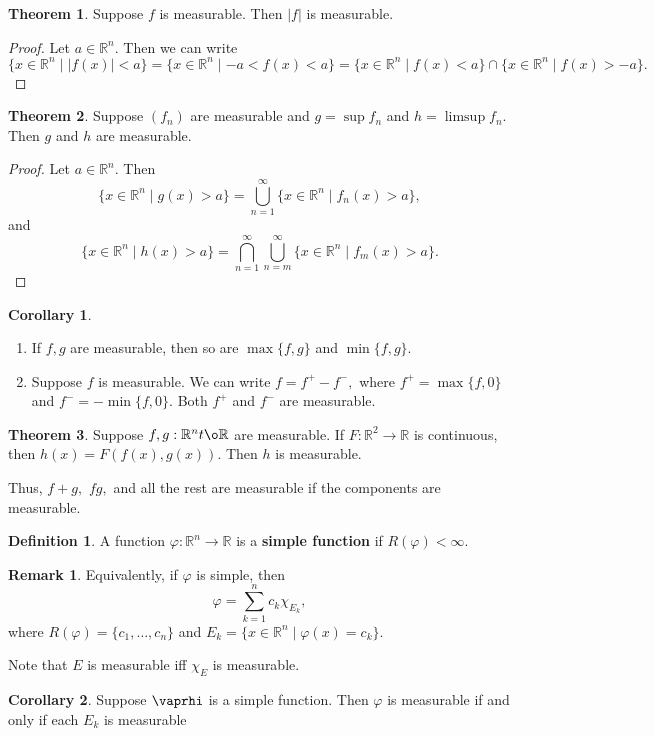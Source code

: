 \documentclass[10pt, oneside]{article}
\newcommand{\bbR}{\mathbb{R}}
\theoremstyle{definition}
\newtheorem{thm}{Theorem}
\newtheorem{defn}{Definition}
\newtheorem{rem}{Remark}
\newtheorem{cor}{Corollary}
\begin{document}
\begin{thm}
    Suppose $f$ is measurable. Then $|f|$ is measurable.
\end{thm}
\begin{proof}
    Let $a\in \bbR^n.$ Then we can write
    \[\{x \in \bbR^n \mid |f(x)| < a\} = \{x \in \bbR^n \mid -a<f(x) < a\} = \{x \in \bbR^n \mid f(x) < a\} \cap \{x \in \bbR^n \mid f(x) >- a\}.\]
\end{proof}
\begin{thm}
    Suppose $(f_n)$ are measurable and $g = \sup f_n$ and $h = \limsup f_n.$ Then $g$ and $h$ are measurable.
\end{thm}
\begin{proof}
    Let $a\in \bbR^n.$ Then 
    \[\{x \in \bbR^n \mid g(x) > a\} = \bigcup_{n=1}^\infty \{x \in \bbR^n \mid f_n(x) >a\},\] and 
    \[\{x \in \bbR^n \mid h(x) > a\} = \bigcap_{n=1}^\infty\bigcup_{n=m}^\infty \{x \in \bbR^n \mid f_m(x) >a\}.\]
\end{proof}

\begin{cor}
\begin{enumerate}
    \item If $f,g$ are measurable, then so are $\max\{f,g\}$ and $\min\{f,g\}.$
    \item Suppose $f$ is measurable. We can write $f = f^+ - f^-,$ where $f^+ = \max\{f,0\}$ and $f^- = -\min\{f,0\}.$ Both $f^+$ and $f^-$ are measurable.
\end{enumerate}
\end{cor}

\begin{thm}
    Suppose $f,g: \bbR^n t\o \bbR$ are measurable. If $F: \bbR^2 \to \bbR$ is continuous, then $h(x) = F(f(x), g(x)).$ Then $h$ is measurable. 
\end{thm}
Thus, $f + g,$ $fg,$ and all the rest are measurable if the components are measurable.

\begin{defn}
    A function $\varphi: \bbR^n \to \bbR$ is a \textbf{simple function} if $R(\varphi) < \infty.$
\end{defn}
\begin{rem}
    Equivalently, if $\varphi$ is simple, then 
    \[\varphi = \sum_{k=1}^n c_k \chi_{E_k},\] where $R(\varphi)= \{c_1, \dots, c_n\}$ and $E_k  = \{x \in \bbR^n \mid \varphi(x)  = c_k\}.$
\end{rem}
Note that $E$ is measurable iff $\chi_E$ is measurable.
\begin{cor}
    Suppose $\vaprhi$ is a simple function. Then $\varphi$ is measurable if and only if each $E_k$ is measurable
\end{cor}
\end{document}

